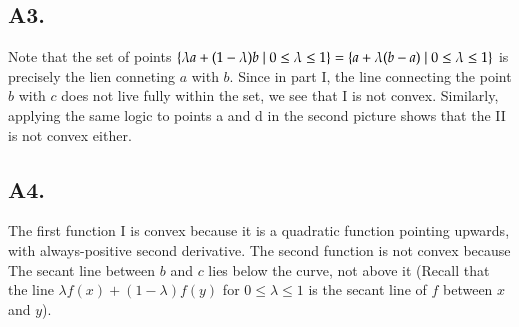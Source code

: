 \documentclass[12pt]{article}
\theoremstyle{definitionstyle}
\newcommand{\SET}[1]{\Set{\mskip-\medmuskip #1 \mskip-\medmuskip}}
\begin{document}
    \subsection*{A3.}
    Note that the set of points $\SET{\lambda a + (1-\lambda)b \mid 0 \leq \lambda \leq 1} = \SET{a + \lambda(b-a) \mid 0 \leq \lambda \leq 1}$ is precisely the lien conneting $a$ with $b$. Since in part I, the line connecting the point $b$ with $c$ does not live fully within the set, we see that I is not convex. Similarly, applying the same logic to points a and d in the second picture shows that the II is not convex either.

    \subsection*{A4.}
    The first function I is convex because it is a quadratic function pointing upwards, with always-positive second derivative. The second function is not convex because The secant line between $b$ and $c$ lies below the curve, not above it (Recall that the line $\lambda f(x) + (1-\lambda)f(y)$ for $0 \leq \lambda \leq 1$ is the secant line of $f$ between $x$ and $y$).
\end{document}
